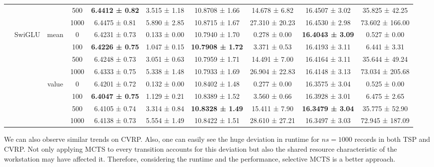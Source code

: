 \documentclass{article}
\begin{document}
\begin{table}[htbp]
{\begin{tabular}{c|c|c|c|c|c|c|c|c|c}
           &        &        & 500    & \textbf{6.4412 ± 0.82} & 3.515 ± 1.18 & 10.8708 ± 1.66 & 14.678 ± 6.82 & 16.4507 ± 3.02 & 35.825 ± 42.25 \\
           &        &        & 1000   & 6.4475 ± 0.81 & 5.890 ± 2.85 & 10.8715 ± 1.67 & 27.310 ± 20.23 & 16.4530 ± 2.98 & 73.602 ± 166.00 \\
\cmidrule{2-10}           & \multicolumn{1}{c|}{\multirow{8}[4]{*}{SwiGLU}} & \multicolumn{1}{c|}{\multirow{4}[2]{*}{mean}} & 0      & 6.4231 ± 0.73 & 0.133 ± 0.00 & 10.7940 ± 1.70 & 0.278 ± 0.00 & \textbf{16.4043 ± 3.09} & 0.527 ± 0.00 \\
           &        &        & 100    & \textbf{6.4226 ± 0.75} & 1.047 ± 0.15 & \textbf{10.7908 ± 1.72} & 3.371 ± 0.53 & 16.4193 ± 3.11 & 6.441 ± 3.31 \\
           &        &        & 500    & 6.4248 ± 0.73 & 3.051 ± 0.63 & 10.7959 ± 1.71 & 14.491 ± 7.00 & 16.4164 ± 3.11 & 35.644 ± 49.24 \\
           &        &        & 1000   & 6.4333 ± 0.75 & 5.338 ± 1.48 & 10.7933 ± 1.69 & 26.904 ± 22.83 & 16.4148 ± 3.13 & 73.034 ± 205.68 \\
\cmidrule{3-10}           &        & \multicolumn{1}{c|}{\multirow{4}[2]{*}{value}} & 0      & 6.4201 ± 0.72 & 0.132 ± 0.00 & 10.8402 ± 1.48 & 0.277 ± 0.00 & 16.3575 ± 3.04 & 0.525 ± 0.00 \\
           &        &        & 100    & \textbf{6.4047 ± 0.75} & 1.129 ± 0.21 & 10.8389 ± 1.52 & 3.560 ± 0.66 & 16.3928 ± 3.01 & 6.475 ± 2.65 \\
           &        &        & 500    & 6.4105 ± 0.74 & 3.314 ± 0.84 & \textbf{10.8328 ± 1.49} & 15.411 ± 7.90 & \textbf{16.3479 ± 3.04} & 35.775 ± 52.90 \\
           &        &        & 1000   & 6.4138 ± 0.73 & 5.554 ± 1.49 & 10.8422 ± 1.51 & 28.610 ± 27.21 & 16.3497 ± 3.03 & 72.945 ± 187.09 \\
    \bottomrule
    \end{tabular}%
    }
  \label{tab:non-selective MCTS CVRP}%
\end{table}%

 We can also observe similar trends on CVRP. Also, one can easily see the huge deviation in runtime for $ns=1000$ records in both TSP and CVRP. Not only applying MCTS to every transition accounts for this deviation but also the shared resource characteristic of the workstation may have affected it. Therefore, considering the runtime and the performance, selective MCTS is a better approach.
\end{document}

